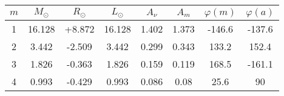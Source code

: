 \begin{table}[h!]
    \centering
    \begin{tabular}{cccccccc}
        \toprule
        {$m$} & {$M_\odot$} & {$R_\odot$} & {$L_\odot$} & {$A_\nu$} & {$A_m$} & {$\varphi(m)$} & {$\varphi(a)$} \\ \midrule
        1  & 16.128 & +8.872 & 16.128 & 1.402 & 1.373 & -146.6 & -137.6 \\
        2  & 3.442  & -2.509 & 3.442  & 0.299 & 0.343 & 133.2  & 152.4  \\ \midrule
        3  & 1.826  & -0.363 & 1.826  & 0.159 & 0.119 & 168.5  & -161.1 \\
        4  & 0.993  & -0.429 & 0.993  & 0.086 & 0.08  & 25.6   & 90     \\ \bottomrule
    \end{tabular}
\end{table}